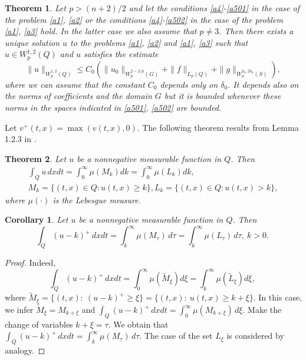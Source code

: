 \documentclass{article}
\theoremstyle{plain}
\newtheorem{theorem}{Theorem}
\newtheorem{corollary}{Corollary}
\begin{document}
\begin{theorem} \label{thr0}   Let  $ p>(n+2)/2$ and let the conditions 
{\rm     \eqref{a4}-\eqref{a501}} in the case of the problem {\rm \eqref{a1}, \eqref{a2}} or the conditions    {\rm  \eqref{a4}-\eqref{a502}} in the case of the problem  {\rm \eqref{a1}, \eqref{a3}} hold. In the latter case we also assume that $p\neq 3$.
 Then there exists a unique solution   $u$ to the problems  {\rm \eqref{a1}, \eqref{a2}} and {\rm \eqref{a1}, \eqref{a3}}  such that 
 $u\in W_p^{1,2}(Q)$ and $u$ satisfies the estimate 
\begin{equation}\label{a6}
 \|u\|_{W_{p}^{1,2}(Q)}\leq
C_{0}(\|u_{0}\|_{W_{p}^{2-2/p}(G)}+
\|f\|_{L_{p}(Q)}+\|g\|_{W_{p}^{k_{0},2k_{0}}(S)}),
\end{equation}
where we can assume that the constant  $C_0$ depends only on  $\delta_0$. It depends also on the norms of coefficients  and the domain $G$ but
it is bounded whenever these  norms in the spaces indicated  in \eqref{a501}, \eqref{a502} are bounded. 
\end{theorem} 

Let $v^+(t,x)=\max(v(t,x),0)$.
The following theorem results from Lemma 1.2.3 in \cite{maz}. 

\begin{theorem}\label{thr1} Let $u$ be a nonnegative measurable function in $Q$. Then 
\begin{multline*}
\int_Q u\,dxdt= \int_0^\infty \mu(M_k)dk=\int_0^\infty \mu(L_k)dk, \\ M_k=\{(t,x)\in Q: u(t,x)\geq k\}, L_k=\{(t,x)\in Q: u(t,x)>  k\},
\end{multline*} 
where $\mu(\cdot)$ is the Lebesgue measure.
\end{theorem}
\begin{corollary}\label{col1} Let  $u$ be a nonnegative measurable function in  $Q$. Then 
$$
\int_Q (u-k)^+\,dxdt= \int_k^\infty \mu(M_\tau)\,d\tau =\int_k^\infty \mu(L_\tau)\,d\tau, \ k>0.\
$$ 
\end{corollary}\label{col1}
\begin{proof} Indeed, 
$$
\int_Q(u-k)^+\,dxdt= \int_0^\infty \mu(\tilde{M}_\xi)d\xi =\int_k^\infty \mu(\tilde{L}_\xi) d\xi,\
$$
where $\tilde{M}_\xi=\{(t,x):\ (u-k)^+\geq \xi\}=\{(t,x):\ u(t,x)\geq k+\xi\}$. In this case, we infer 
$\tilde{M}_\xi=M_{k+\xi}$ and
 $\int_Q (u-k)^+\,dxdt= \int_0^{\infty}\mu(M_{k+\xi})\,d\xi$. Make the change of variables  $k+\xi=\tau$. We obtain that 
$\int_Q (u-k)^+\,dxdt=\int_k^\infty \mu(M_\tau)\,d\tau$. The case of the set $L_\xi$ is considered by analogy.
\end{proof}
\end{document}
